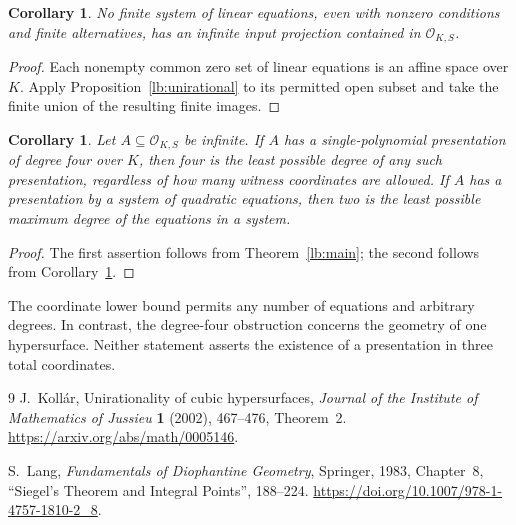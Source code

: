 \documentclass[11pt,a4paper]{article}
\newtheorem{corollary}[theorem]{Corollary}
\theoremstyle{definition}
\newcommand{\OKS}{\mathcal O_{K,S}}
\begin{document}
\begin{corollary}\label{lb:linear-systems}
No finite system of linear equations, even with nonzero conditions
and finite alternatives, has an infinite input projection contained
in $\OKS$.
\end{corollary}
\begin{proof}
Each nonempty common zero set of linear equations is an affine
space over $K$. Apply Proposition~\ref{lb:unirational} to its
permitted open subset and take the finite union of the resulting
finite images.
\end{proof}

\begin{corollary}\label{lb:degree-sharpness}
Let $A\subseteq\OKS$ be infinite. If $A$ has a single-polynomial
presentation of degree four over $K$, then four is the least
possible degree of any such presentation, regardless of how many
witness coordinates are allowed. If $A$ has a presentation by a
system of quadratic equations, then two is the least possible
maximum degree of the equations in a system.
\end{corollary}
\begin{proof}
The first assertion follows from Theorem~\ref{lb:main}; the second
follows from Corollary~\ref{lb:linear-systems}.
\end{proof}

The coordinate lower bound permits any number of equations and
arbitrary degrees. In contrast, the degree-four obstruction concerns
the geometry of one hypersurface. Neither statement asserts the
existence of a presentation in three total coordinates.

\begin{thebibliography}{9}
J.~Koll\'ar, Unirationality of cubic hypersurfaces,
\emph{Journal of the Institute of Mathematics of Jussieu}
\textbf{1} (2002), 467--476, Theorem~2.
\url{https://arxiv.org/abs/math/0005146}.

S.~Lang, \emph{Fundamentals of Diophantine Geometry},
Springer, 1983, Chapter~8, ``Siegel's Theorem and Integral Points'',
188--224.
\url{https://doi.org/10.1007/978-1-4757-1810-2_8}.
\end{thebibliography}
\end{document}
